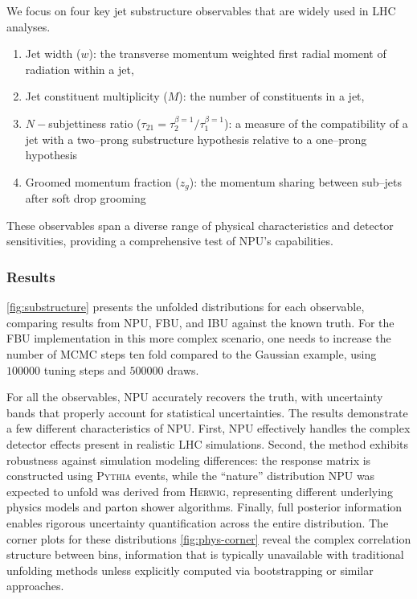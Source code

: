         We focus on four key jet substructure observables that are widely used in LHC analyses.
        \begin{enumerate}
            \item Jet width (\(w\)): the transverse momentum weighted first radial moment of radiation within a jet,
            \item Jet constituent multiplicity ($M$): the number of constituents in a jet,
            \item \(N-\)subjettiness ratio ($\tau_{21} = \tau_2^{\beta=1}/\tau_1^{\beta=1}$): a measure of the compatibility of a jet with a two--prong substructure hypothesis relative to a one--prong hypothesis~\cite{Thaler2011IdentifyingN-subjettiness, Thaler2012MaximizingN-subjettiness, DevNairDevelopmentData}
            \item Groomed momentum fraction ($z_g$): the momentum sharing between sub--jets after soft drop grooming~\cite{Larkoski2014SoftDrop, Dasgupta2013TowardsSubstructure}
        \end{enumerate}
        These observables span a diverse range of physical characteristics and detector sensitivities, providing a comprehensive test of NPU's capabilities.
    \subsubsection{Results}
        \cref{fig:substructure} presents the unfolded distributions for each observable, comparing results from NPU, FBU, and IBU against the known truth.
        For the FBU implementation in this more complex scenario, one needs to increase the number of MCMC steps ten fold compared to the Gaussian example, using \(\num{100000}\) tuning steps and \(\num{500000}\) draws.
        
        For all the observables, NPU accurately recovers the truth, with uncertainty bands that properly account for statistical uncertainties.
        The results demonstrate a few different characteristics of NPU.
        First, NPU effectively handles the complex detector effects present in realistic LHC simulations.
        Second, the method exhibits robustness against simulation modeling differences: the response matrix is constructed using \textsc{Pythia} events, while the ``nature'' distribution NPU was expected to unfold was derived from \textsc{Herwig}, representing different underlying physics models and parton shower algorithms.
        Finally, full posterior information enables rigorous uncertainty quantification across the entire distribution.
        The corner plots for these distributions \cref{fig:phys-corner} reveal the complex correlation structure between bins, information that is typically unavailable with traditional unfolding methods unless explicitly computed via bootstrapping or similar approaches.

